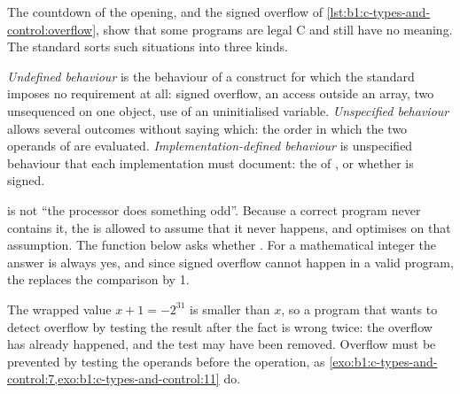 The countdown of the opening, and the signed overflow of \cref{lst:b1:c-types-and-control:overflow}, show that some
programs are legal C and still have no meaning. The standard sorts such situations into three kinds.

\begin{definition}\label{def:b1:c-types-and-control:ub}
\emph{Undefined behaviour} is the behaviour of a construct for which the standard imposes
no requirement at all: signed overflow, an access outside an array, two unsequenced  on one object,
use of an uninitialised variable. \emph{Unspecified behaviour} allows several outcomes
without saying which: the order in which the two operands of \code{+} are evaluated. \emph{Implementation-defined
behaviour} is unspecified behaviour that each implementation must document:
the  of , or whether  is signed.
\end{definition}

 is not ``the processor does something odd''. Because a correct program never contains it, the
 is allowed to assume that it never happens, and optimises on that assumption. The function below asks
whether . For a mathematical integer the answer is always yes, and since signed overflow cannot
happen in a valid program, the  replaces the comparison by 1.

\label{lst:b1:c-types-and-control:fold}

\label{out:b1:c-types-and-control:fold}

The wrapped value $x + 1 = -2^{31}$ is smaller than $x$, so a program that wants to detect overflow by testing the
result after the fact is wrong twice: the overflow has already happened, and the test may have been removed.
Overflow must be prevented by testing the operands before the operation, as \cref{exo:b1:c-types-and-control:7,exo:b1:c-types-and-control:11}
do.

